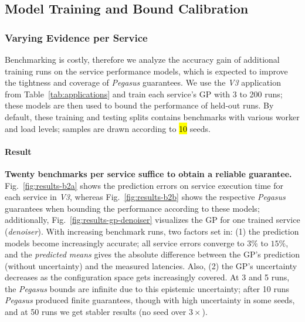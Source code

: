 \subsection{Model Training and Bound Calibration}

\subsubsection{Varying Evidence per Service}

Benchmarking is costly, therefore we analyze the accuracy gain of additional training runs on the service performance models, which is expected to improve the tightness and coverage of \textit{Pegasus} guarantees. We use the \textit{V3} application from Table~\ref{tab:applications} and train each service's GP with 3 to 200 runs; these models are then used to bound the performance of held-out runs. By default, these training and testing splits contains benchmarks with various worker and load levels; samples are drawn according to \hl{10} seeds.

\paragraph{Result}
\textbf{Twenty benchmarks per service suffice to obtain a reliable guarantee. }
%
Fig.~\ref{fig:results-b2a} shows the prediction errors on service execution time for each service in \textit{V3}, whereas Fig.~\ref{fig:results-b2b} shows the respective \textit{Pegasus} guarantees when bounding the performance according to these models; additionally, Fig.~\ref{fig:results-gp-denoiser} visualizes the GP for one trained service (\textit{denoiser}). With increasing benchmark runs, two factors set in: (1) the prediction models become increasingly accurate; all service errors converge to $3\%$ to $15\%$, and the \textit{predicted means} gives the absolute difference between the GP's prediction (without uncertainty) and the measured latencies. 
Also, (2) the GP's uncertainty decreases as the configuration space gets increasingly covered.
%
At 3 and 5 runs, the \textit{Pegasus} bounds are infinite due to this epistemic uncertainty; after 10 runs \textit{Pegasus} produced finite guarantees, though with high uncertainty in some seeds, and at 50 runs we get stabler results (no seed over $3\times$).


